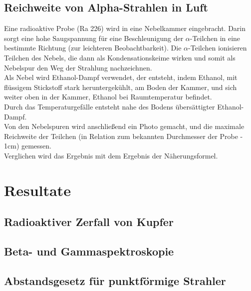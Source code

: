\documentclass[12pt,a4paper]{article}
\begin{document}
\begin{multicols}{2}
\subsection{Reichweite von Alpha-Strahlen in Luft}

Eine radioaktive Probe (Ra 226) wird in eine Nebelkammer eingebracht. Darin sorgt eine hohe Saugspannung für eine Beschleunigung der $\alpha$-Teilchen in eine bestimmte Richtung (zur leichteren Beobachtbarkeit). Die $\alpha$-Teilchen ionisieren Teilchen des Nebels, die dann als Kondensationskeime wirken und somit als Nebelspur den Weg der Strahlung nachzeichnen.\\
Als Nebel wird Ethanol-Dampf verwendet, der entsteht, indem Ethanol, mit flüssigem Stickstoff stark heruntergekühlt, am Boden der Kammer, und sich weiter oben in der Kammer, Ethanol bei Raumtemperatur befindet.\\
Durch das Temperaturgefälle entsteht nahe des Bodens übersättigter Ethanol-Dampf.\\

\noindent Von den Nebelspuren wird anschließend ein Photo gemacht, und die maximale Reichweite der Teilchen (in Relation zum bekannten Durchmesser der Probe - 1cm) gemessen.\\
Verglichen wird das Ergebnis mit dem Ergebnis der Näherungsformel.


\pagebreak
\section{Resultate}
\subsection{Radioaktiver Zerfall von Kupfer}

\subsection{Beta- und Gammaspektroskopie}

\subsection{Abstandsgesetz für punktförmige Strahler}


\end{multicols}
\end{document}
